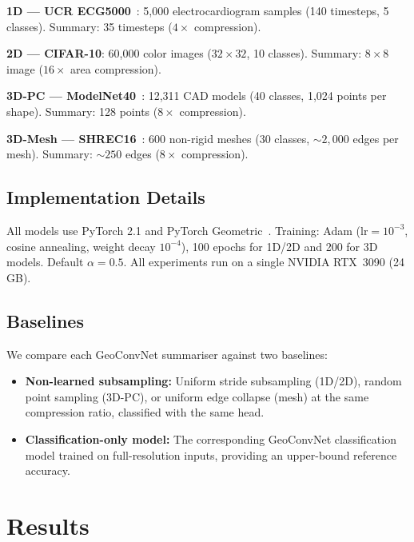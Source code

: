 \documentclass[10pt,conference]{IEEEtran}
\begin{document}
\noindent\textbf{1D --- UCR ECG5000}~\cite{dau2019ucr}: 5{,}000
electrocardiogram samples (140 timesteps, 5 classes).
Summary: 35 timesteps ($4\times$ compression).

\noindent\textbf{2D --- CIFAR-10}: 60{,}000 color images
($32{\times}32$, 10 classes).
Summary: $8{\times}8$ image ($16\times$ area compression).

\noindent\textbf{3D-PC --- ModelNet40}~\cite{wu2015shapenets}: 12{,}311
CAD models (40 classes, 1{,}024 points per shape).
Summary: 128 points ($8\times$ compression).

\noindent\textbf{3D-Mesh --- SHREC16}~\cite{hanocka2019meshcnn}: 600
non-rigid meshes (30 classes, ${\sim}2{,}000$ edges per mesh).
Summary: ${\sim}250$ edges ($8\times$ compression).

\subsection{Implementation Details}

All models use PyTorch 2.1 and PyTorch Geometric~\cite{fey2019pyg}.
Training: Adam ($\mathrm{lr}=10^{-3}$, cosine annealing, weight decay
$10^{-4}$), 100 epochs for 1D/2D and 200 for 3D models.  Default
$\alpha=0.5$.  All experiments run on a single NVIDIA RTX~3090 (24\,GB).

\subsection{Baselines}

We compare each GeoConvNet summariser against two baselines:
\begin{itemize}
  \item \textbf{Non-learned subsampling:} Uniform stride subsampling
    (1D/2D), random point sampling (3D-PC), or uniform edge collapse
    (mesh) at the same compression ratio, classified with the same head.
  \item \textbf{Classification-only model:} The corresponding GeoConvNet
    classification model trained on full-resolution inputs, providing an
    upper-bound reference accuracy.
\end{itemize}

\section{Results}
\label{sec:results}
\end{document}
